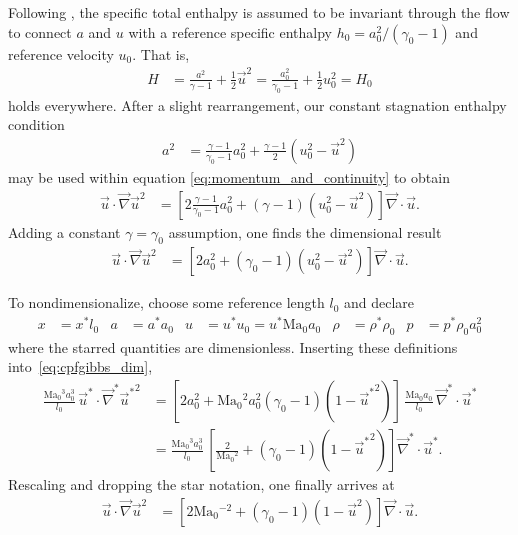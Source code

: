 \documentclass[letterpaper,11pt,nointlimits,reqno]{amsart}
\newcommand{\Mach}[1][]{\mbox{Ma}_{#1}}
\begin{document}
Following \citeauthor{Saad2011Coordinate}, the specific total enthalpy is
assumed to be invariant through the flow to connect $a$ and $u$ with a
reference specific enthalpy $h_0 = a_0^2 / \left(\gamma_0-1\right)$ and
reference velocity $u_0$.  That is,
\begin{align}
     H
     &=
        \frac{a^2  }{\gamma  -1} + \frac{1}{2} \vec{u}^2
      = \frac{a_0^2}{\gamma_0-1} + \frac{1}{2} u_0^2
      =  H_0
\label{eq:constant_specific_stagnation_enthalpy}
\end{align}
holds everywhere.  After a slight rearrangement, our constant stagnation
enthalpy condition
\begin{align}
        a^2
     &=   \frac{\gamma-1}{\gamma_0-1} a_0^2
        + \frac{\gamma-1}{2} \left(u_0^2 - \vec{u}^2\right)
\label{eq:stagnation_sound}
\end{align}
may be used within equation \eqref{eq:momentum_and_continuity} to obtain
\begin{align}
       \vec{u}\cdot \vec{\nabla}\vec{u}^2
    &= \left[
          2 \frac{\gamma-1}{\gamma_0-1} a_0^2
        + \left(\gamma-1\right) \left(u_0^2 - \vec{u}^2\right)
       \right]\vec{\nabla}\cdot\vec{u}
.
\end{align}
Adding a constant $\gamma=\gamma_0$ assumption, one finds the dimensional result
\begin{align}
       \vec{u}\cdot \vec{\nabla}\vec{u}^2
    &= \left[
          2 a_0^2
        + \left(\gamma_0-1\right) \left(u_0^2 - \vec{u}^2\right)
       \right]\vec{\nabla}\cdot\vec{u}
\label{eq:cpfgibbs_dim}
.
\end{align}

To nondimensionalize, choose some reference length $l_0$ and declare
\begin{align}
    x     &= x^\ast l_0
&   a     &= a^\ast a_0
&   u     &= u^\ast u_0 = u^\ast \Mach[0] a_0
&   \rho  &= \rho^\ast \rho_0
&   p     &= p^\ast \rho_0 a_0^2
\label{eq:nondimensionalization}
\end{align}
where the starred quantities are dimensionless.  Inserting these definitions
into~\eqref{eq:cpfgibbs_dim},
\begin{align}
       \frac{\Mach[0]{}^3 a_0^3}{l_0}
       \,
       \vec{u}^\ast \cdot \vec{\nabla}^\ast{\vec{u}^\ast}^2
    &=
       \left[
          2 a_0^2
        + \Mach[0]{}^2 a_0^2 \left(\gamma_0-1\right) \left(1 - {\vec{u}^\ast}^2\right)
       \right]
       \,
       \frac{\Mach[0]{} a_0}{l_0}
       \,
       \vec{\nabla}^\ast\cdot\vec{u}^\ast
\\
    &=
       \frac{\Mach[0]{}^3 a_0^3}{l_0}
       \,
       \left[
          \frac{2}{\Mach[0]{}^2}
        + \left(\gamma_0-1\right) \left(1 - {\vec{u}^\ast}^2\right)
       \right]
       \vec{\nabla}^\ast\cdot\vec{u}^\ast
.
\end{align}
Rescaling and dropping the star notation, one finally arrives at
\begin{align}
       \vec{u} \cdot \vec{\nabla}\vec{u}^2
    &=
       \left[
          2 \Mach[0]{}^{-2}
        + \left(\gamma_0-1\right) \left(1 - \vec{u}^2\right)
       \right]
       \vec{\nabla}\cdot\vec{u}
\label{eq:cpfgibbs_nondim}
.
\end{align}
\end{document}
